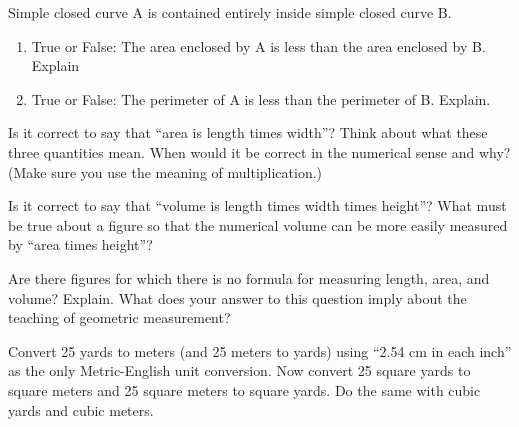 \begin{prob}Simple closed curve A is contained entirely inside simple closed curve B.  
\begin{enumerate}
\item True or False:  The area enclosed by A is less than the area enclosed by B. Explain
\item True or False:  The perimeter of A is less than the perimeter of B. Explain.  
\end{enumerate}
\end{prob}

\begin{prob}
Is it correct to say that ``area is length times width''?  Think about what these three quantities mean.  When would it be correct in the numerical sense and why?  (Make sure you use the meaning of multiplication.)   
\end{prob}


\begin{prob}
 Is it correct to say that ``volume is length times width times height''? What must be true about a figure so that the numerical volume can be more easily measured by ``area times height''?
\end{prob}

\begin{prob}
Are there figures for which there is no formula for measuring length, area, and volume?  Explain.  What does your answer to this question imply about the teaching of geometric measurement?
\end{prob}

\begin{prob}
Convert 25 yards to meters (and 25 meters to yards) using ``2.54 cm in each inch'' as the only Metric-English unit conversion.  Now convert 25 square yards to square meters and 25 square meters to square yards.  Do the same with cubic yards and cubic meters.
\end{prob}


